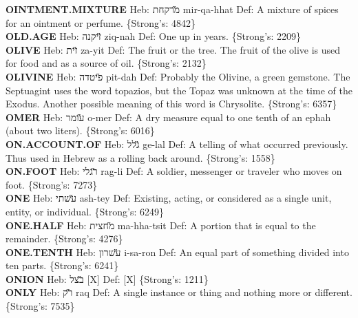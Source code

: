 {\textbf{OINTMENT.MIXTURE} Heb: {\large\H מרקחת} mir-qa-hhat Def: A mixture of spices for an ointment or perfume. \{Strong's: 4842\}\hfill{}\\

\textbf{OLD.AGE} Heb: {\large\H זיקנה} ziq-nah Def: One up in years. \{Strong's: 2209\}\hfill{}\\

\textbf{OLIVE} Heb: {\large\H זית} za-yit Def: The fruit or the tree. The fruit of the olive is used for food and as a source of oil. \{Strong's: 2132\}\hfill{}\\

\textbf{OLIVINE} Heb: {\large\H פיטדה} pit-dah Def: Probably the Olivine, a green gemstone. The Septuagint uses the word topazios, but the Topaz was unknown at the time of the Exodus. Another possible meaning of this word is Chrysolite. \{Strong's: 6357\}\hfill{}\\

\textbf{OMER} Heb: {\large\H עומר} o-mer Def: A dry measure equal to one tenth of an ephah (about two liters). \{Strong's: 6016\}\hfill{}\\

\textbf{ON.ACCOUNT.OF} Heb: {\large\H גלל} ge-lal Def: A telling of what occurred previously. Thus used in Hebrew as a rolling back around. \{Strong's: 1558\}\hfill{}\\

\textbf{ON.FOOT} Heb: {\large\H רגלי} rag-li Def: A soldier, messenger or traveler who moves on foot. \{Strong's: 7273\}\hfill{}\\

\textbf{ONE} Heb: {\large\H עשתי} ash-tey Def: Existing, acting, or considered as a single unit, entity, or individual. \{Strong's: 6249\}\hfill{}\\

\textbf{ONE.HALF} Heb: {\large\H מחצית} ma-hha-tsit Def: A portion that is equal to the remainder. \{Strong's: 4276\}\hfill{}\\

\textbf{ONE.TENTH} Heb: {\large\H עשרון} i-sa-ron Def: An equal part of something divided into ten parts. \{Strong's: 6241\}\hfill{}\\

\textbf{ONION} Heb: {\large\H בצל} {[}X{]} Def: {[}X{]} \{Strong's: 1211\}\hfill{}\\

\textbf{ONLY} Heb: {\large\H רק} raq Def: A single instance or thing and nothing more or different. \{Strong's: 7535\}\hfill{}\\

}
